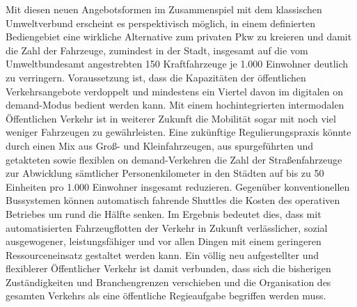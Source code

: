 Mit diesen neuen Angebotsformen im Zusammenspiel mit dem klassischen Umweltverbund erscheint es perspektivisch möglich, in einem definierten Bediengebiet eine wirkliche Alternative zum
privaten Pkw zu kreieren und damit die Zahl der Fahrzeuge, zumindest in der Stadt, insgesamt auf die
vom Umweltbundesamt angestrebten 150 Kraftfahrzeuge je 1.000 Einwohner deutlich zu verringern.
Voraussetzung ist, dass die Kapazitäten der öffentlichen Verkehrsangebote verdoppelt und mindestens ein Viertel davon im digitalen on demand-Modus bedient werden kann.
Mit einem hochintegrierten intermodalen Öffentlichen Verkehr ist in weiterer Zukunft die Mobilität
sogar mit noch viel weniger Fahrzeugen zu gewährleisten.
Eine zukünftige Regulierungspraxis könnte
durch einen Mix aus Groß- und Kleinfahrzeugen, aus spurgeführten und getakteten sowie flexiblen
on demand-Verkehren die Zahl der Straßenfahrzeuge zur Abwicklung sämtlicher Personenkilometer
in den Städten auf bis zu 50 Einheiten pro 1.000 Einwohner insgesamt reduzieren.
Gegenüber konventionellen Bussystemen können automatisch fahrende Shuttles die Kosten des operativen Betriebes um rund die Hälfte senken.
Im Ergebnis bedeutet dies, dass mit automatisierten Fahrzeugflotten
der Verkehr in Zukunft verlässlicher, sozial ausgewogener, leistungsfähiger und vor allen Dingen mit
einem geringeren Ressourceneinsatz gestaltet werden kann.
Ein völlig neu aufgestellter und flexiblerer Öffentlicher Verkehr ist damit verbunden, dass sich die
bisherigen Zuständigkeiten und Branchengrenzen verschieben und die Organisation des gesamten
Verkehrs als eine öffentliche Regieaufgabe begriffen werden muss.

